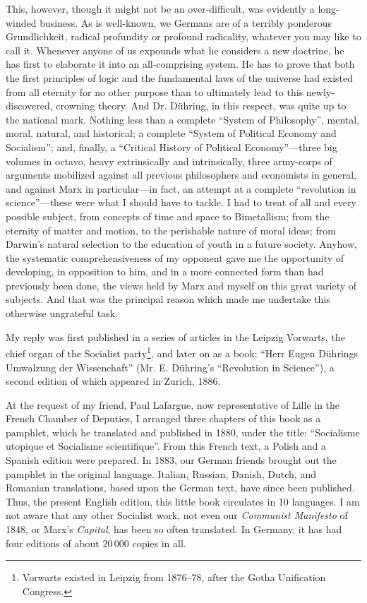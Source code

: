 This, however, though it might not be an over-difficult, was evidently a
long-winded business. As is well-known, we Germans are of a terribly ponderous
Grundlichkeit, radical profundity or profound radicality, whatever you may like
to call it. Whenever anyone of us expounds what he considers a new doctrine,
he has first to elaborate it into an all-comprising system. He has to prove
that both the first principles of logic and the fundamental laws of the
universe had existed from all eternity for no other purpose than to
ultimately lead to this newly-discovered, crowning theory. And Dr. Dühring,
in this respect, was quite up to the national mark. Nothing less than a
complete ``System of Philosophy'', mental, moral, natural, and historical; a
complete ``System of Political Economy and Socialism''; and, finally, a
``Critical History of Political Economy''---three big volumes in octavo, heavy
extrinsically and intrinsically, three army-corps of arguments mobilized
against all previous philosophers and economists in general, and against Marx
in particular---in fact, an attempt at a complete ``revolution in
science''---these were what I should have to tackle. I had to treat of all and
every possible subject, from concepts of time and space to Bimetallism; from the
eternity of matter and motion, to the perishable nature of moral ideas; from
Darwin's natural selection to the education of youth in a future society.
Anyhow, the systematic comprehensiveness of my opponent gave me the opportunity
of developing, in opposition to him, and in a more connected form than had
previously been done, the views held by Marx and myself on this great variety
of subjects. And that was the principal reason which made me undertake this
otherwise ungrateful task.

My reply was first published in a series of articles in the Leipzig Vorwarts,
the chief organ of the Socialist party\footnote{
  Vorwarts existed in Leipzig from 1876--78, after the Gotha Unification
  Congress.
}, and later on as a book: ``Herr Eugen Dührings Umwalzung der Wissenchaft''
(Mr. E. Dühring's ``Revolution in Science''), a second edition of which appeared
in Zurich, 1886.

At the request of my friend, Paul Lafargue, now representative of Lille in the
French Chamber of Deputies, I arranged three chapters of this book as a
pamphlet, which he translated and published in 1880, under the title:
``Socialisme utopique et Socialisme scientifique''. From this French text, a
Polish and a Spanish edition were prepared. In 1883, our German friends
brought out the pamphlet in the original language. Italian, Russian, Danish,
Dutch, and Romanian translations, based upon the German text, have since been
published. Thus, the present English edition, this little book circulates in
10 languages. I am not aware that any other Socialist work, not even our
\emph{Communist Manifesto} of 1848, or Marx's \emph{Capital}, has been so often
translated. In Germany, it has had four editions of about 20\,000 copies in all.

